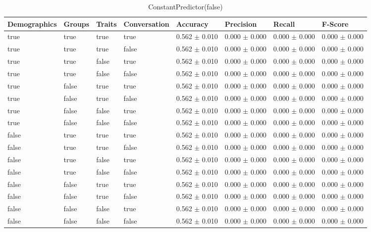 \begin{table}[h]
	\centering
	\begin{tabular}{|l|l|l|l|l|l|l|l|} %
	\hline
	Demographics & Groups & Traits & Conversation & Accuracy & Precision & Recall & F-Score \\ \hline
	true & true & true & true & 0.562	\( \pm \) 0.010	& 0.000 \( \pm \) 0.000 & 0.000	\( \pm \) 0.000	& 0.000 \( \pm \) 0.000 \\ \hline
	true & true & true & false & 0.562	\( \pm \) 0.010	& 0.000 \( \pm \) 0.000 & 0.000	\( \pm \) 0.000	& 0.000 \( \pm \) 0.000 \\ \hline
	true & true & false & true & 0.562	\( \pm \) 0.010	& 0.000 \( \pm \) 0.000 & 0.000	\( \pm \) 0.000	& 0.000 \( \pm \) 0.000 \\ \hline
	true & true & false & false & 0.562	\( \pm \) 0.010	& 0.000 \( \pm \) 0.000 & 0.000	\( \pm \) 0.000	& 0.000 \( \pm \) 0.000 \\ \hline
	true & false & true & true & 0.562	\( \pm \) 0.010	& 0.000 \( \pm \) 0.000 & 0.000	\( \pm \) 0.000	& 0.000 \( \pm \) 0.000 \\ \hline
	true & false & true & false & 0.562	\( \pm \) 0.010	& 0.000 \( \pm \) 0.000 & 0.000	\( \pm \) 0.000	& 0.000 \( \pm \) 0.000 \\ \hline
	true & false & false & true & 0.562	\( \pm \) 0.010	& 0.000 \( \pm \) 0.000 & 0.000	\( \pm \) 0.000	& 0.000 \( \pm \) 0.000 \\ \hline
	true & false & false & false & 0.562	\( \pm \) 0.010	& 0.000 \( \pm \) 0.000 & 0.000	\( \pm \) 0.000	& 0.000 \( \pm \) 0.000 \\ \hline
	false & true & true & true & 0.562	\( \pm \) 0.010	& 0.000 \( \pm \) 0.000 & 0.000	\( \pm \) 0.000	& 0.000 \( \pm \) 0.000 \\ \hline
	false & true & true & false & 0.562	\( \pm \) 0.010	& 0.000 \( \pm \) 0.000 & 0.000	\( \pm \) 0.000	& 0.000 \( \pm \) 0.000 \\ \hline
	false & true & false & true & 0.562	\( \pm \) 0.010	& 0.000 \( \pm \) 0.000 & 0.000	\( \pm \) 0.000	& 0.000 \( \pm \) 0.000 \\ \hline
	false & true & false & false & 0.562	\( \pm \) 0.010	& 0.000 \( \pm \) 0.000 & 0.000	\( \pm \) 0.000	& 0.000 \( \pm \) 0.000 \\ \hline
	false & false & true & true & 0.562	\( \pm \) 0.010	& 0.000 \( \pm \) 0.000 & 0.000	\( \pm \) 0.000	& 0.000 \( \pm \) 0.000 \\ \hline
	false & false & true & false & 0.562	\( \pm \) 0.010	& 0.000 \( \pm \) 0.000 & 0.000	\( \pm \) 0.000	& 0.000 \( \pm \) 0.000 \\ \hline
	false & false & false & true & 0.562	\( \pm \) 0.010	& 0.000 \( \pm \) 0.000 & 0.000	\( \pm \) 0.000	& 0.000 \( \pm \) 0.000 \\ \hline
	false & false & false & false & 0.562	\( \pm \) 0.010	& 0.000 \( \pm \) 0.000 & 0.000	\( \pm \) 0.000	& 0.000 \( \pm \) 0.000 \\ \hline
	\end{tabular}
	\caption{ConstantPredictor(false)}
	\label{tab:revpol}
\end{table}
